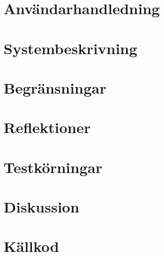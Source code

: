 \documentclass[a4paper, 12pt]{article}
\begin{document}
\section{Användarhandledning}

\section{Systembeskrivning}

\section{Begränsningar}



\section{Reflektioner}

\section{Testkörningar}

\section{Diskussion}

\section{Källkod}
\end{document}
